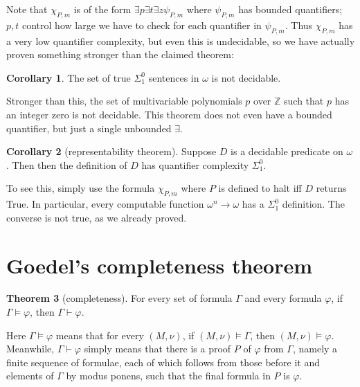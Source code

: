 \documentclass[12pt]{report}
\newcommand{\ZZ}{\mathbb{Z}}
\newcommand{\proves}{\vdash}
\theoremstyle{definition}
\newtheorem{theorem}{Theorem}[chapter]
\newtheorem{corollary}[theorem]{Corollary}
\begin{document}
Note that $\chi_{P,m}$ is of the form $\exists p \exists t \exists z \psi_{P,m}$ where $\psi_{P,m}$ has bounded quantifiers; $p,t$ control how large we have to check for each quantifier in $\psi_{P,m}$. Thus $\chi_{P,m}$ has a very low quantifier complexity, but even this is undecidable, so we have actually proven something stronger than the claimed theorem:
\begin{corollary}
The set of true $\Sigma_1^0$ sentences in $\omega$ is not decidable.
\end{corollary}
Stronger than this, the set of multivariable polynomials $p$ over $\ZZ$ such that $p$ has an integer zero is not decidable. This theorem does not even have a bounded quantifier, but just a single unbounded $\exists$.
\begin{corollary}[representability theorem]
Suppose $D$ is a decidable predicate on $\omega$. Then then the definition of $D$ has quantifier complexity $\Sigma_1^0$.
\end{corollary}
To see this, simply use the formula $\chi_{P,m}$ where $P$ is defined to halt iff $D$ returns True. In particular, every computable function $\omega^n \to \omega$ has a $\Sigma_1^0$ definition. The converse is not true, as we already proved.

\section{Goedel's completeness theorem}
\begin{theorem}[completeness]
For every set of formula $\Gamma$ and every formula $\varphi$, if $\Gamma \models \varphi$, then $\Gamma \proves \varphi$.
\end{theorem}
Here $\Gamma \models \varphi$ means that for every $(M, \nu)$, if $(M, \nu) \models \Gamma$, then $(M, \nu) \models \varphi$. Meanwhile, $\Gamma \proves \varphi$ simply means that there is a proof $P$ of $\varphi$ from $\Gamma$, namely a finite sequence of formulae, each of which follows from those before it and elements of $\Gamma$ by modus ponens, such that the final formula in $P$ is $\varphi$.
\end{document}
